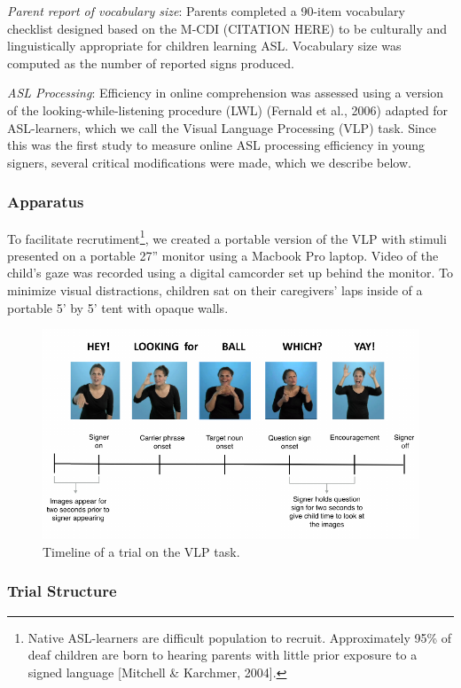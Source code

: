 \documentclass[12pt,]{article}
\let\rmarkdownfootnote\footnote%
\def\footnote{\protect\rmarkdownfootnote}
\begin{document}
\emph{Parent report of vocabulary size}: Parents completed a 90-item
vocabulary checklist designed based on the M-CDI (CITATION HERE) to be
culturally and linguistically appropriate for children learning ASL.
Vocabulary size was computed as the number of reported signs produced.

\emph{ASL Processing}: Efficiency in online comprehension was assessed
using a version of the looking-while-listening procedure (LWL) (Fernald
et al., 2006) adapted for ASL-learners, which we call the Visual
Language Processing (VLP) task. Since this was the first study to
measure online ASL processing efficiency in young signers, several
critical modifications were made, which we describe below.

\subsubsection{Apparatus}\label{apparatus}

To facilitate recrutiment\footnote{Native ASL-learners are difficult
  population to recruit. Approximately 95\% of deaf children are born to
  hearing parents with little prior exposure to a signed language
  {[}Mitchell \& Karchmer, 2004{]}.}, we created a portable version of
the VLP with stimuli presented on a portable 27'' monitor using a
Macbook Pro laptop. Video of the child's gaze was recorded using a
digital camcorder set up behind the monitor. To minimize visual
distractions, children sat on their caregivers' laps inside of a
portable 5' by 5' tent with opaque walls.

\begin{figure}[htbp]
\centering
\includegraphics{Figs/timeline-1.pdf}
\caption{Timeline of a trial on the VLP task.}
\end{figure}

\subsubsection{Trial Structure}\label{trial-structure}
\end{document}
